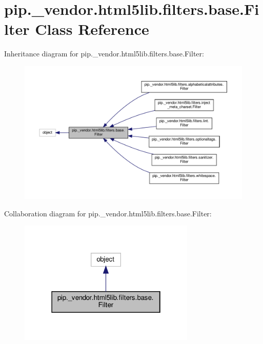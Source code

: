 \hypertarget{classpip_1_1__vendor_1_1html5lib_1_1filters_1_1base_1_1Filter}{}\section{pip.\+\_\+vendor.\+html5lib.\+filters.\+base.\+Filter Class Reference}
\label{classpip_1_1__vendor_1_1html5lib_1_1filters_1_1base_1_1Filter}


Inheritance diagram for pip.\+\_\+vendor.\+html5lib.\+filters.\+base.\+Filter\+:
\nopagebreak
\begin{figure}[H]
\begin{center}
\leavevmode
\includegraphics[width=350pt]{classpip_1_1__vendor_1_1html5lib_1_1filters_1_1base_1_1Filter__inherit__graph}
\end{center}
\end{figure}


Collaboration diagram for pip.\+\_\+vendor.\+html5lib.\+filters.\+base.\+Filter\+:
\nopagebreak
\begin{figure}[H]
\begin{center}
\leavevmode
\includegraphics[width=238pt]{classpip_1_1__vendor_1_1html5lib_1_1filters_1_1base_1_1Filter__coll__graph}
\end{center}
\end{figure}
